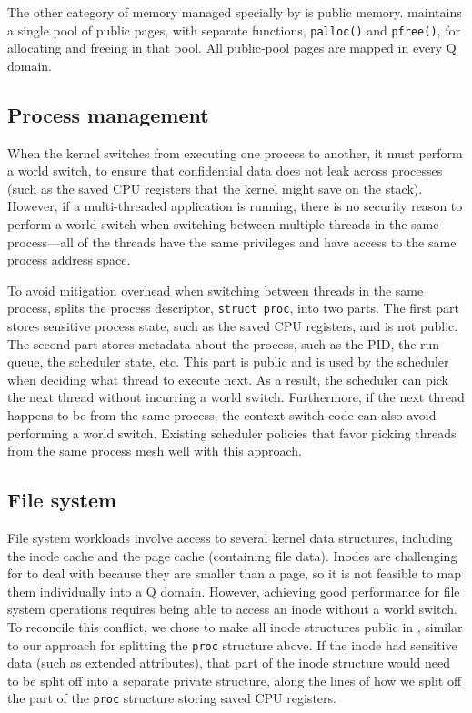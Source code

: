 The other category of memory managed specially by \sys is public memory.
\sys maintains a single pool of public pages, with separate functions,
\texttt{palloc()} and \texttt{pfree()}, for allocating and freeing in
that pool.  All public-pool pages are mapped in every Q domain.


\subsection*{Process management}
\label{ss:proc}

When the \sys kernel switches from executing one process to another, it
must perform a world switch, to ensure that confidential data does not
leak across processes (such as the saved CPU registers that the kernel
might save on the stack).  However, if a multi-threaded application
is running, there is no security reason to perform a world switch when
switching between multiple threads in the same process---all of the
threads have the same privileges and have access to the same process
address space.

To avoid mitigation overhead when switching between threads in the
same process, \sys splits the process descriptor, \texttt{struct
  proc}, into two parts.  The first part stores sensitive process
state, such as the saved CPU registers, and is not public.  The second
part stores metadata about the process, such as the PID, the run
queue, the scheduler state, etc.  This part is public and is used by
the scheduler when deciding what thread to execute next.  As a result,
the scheduler can pick the next thread without incurring a world
switch.  Furthermore, if the next thread happens to be from the same
process, the context switch code can also avoid performing a world
switch.  Existing scheduler policies that favor picking threads from
the same process mesh well with this approach.

\subsection*{File system}
\label{ss:fs}

File system workloads involve access to several kernel data structures,
including the inode cache and the page cache (containing file data).
Inodes are challenging for \sys to deal with because they are smaller than
a page, so it is not feasible to map them individually into a Q domain.
However, achieving good performance for file system operations requires
being able to access an inode without a world switch.  To reconcile
this conflict, we chose to make all inode structures public in \sys,
similar to our approach for splitting the \texttt{proc} structure above.
If the inode had sensitive data (such as extended attributes), that
part of the inode structure would need to be split off into a separate
private structure, along the lines of how we split off the part of the
\texttt{proc} structure storing saved CPU registers.

